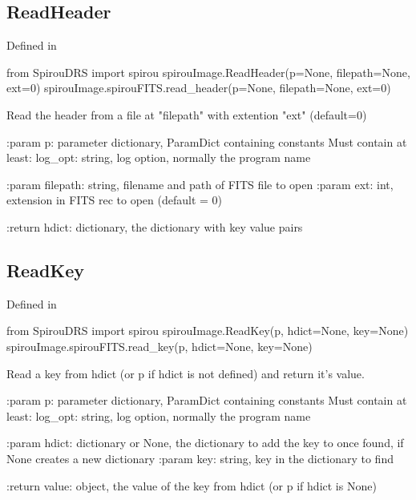 \begin{minipage}{\textwidth}
\subsection{ReadHeader}

Defined in \spirouImage{}

\begin{pythonbox}
from SpirouDRS import spirou
spirouImage.ReadHeader(p=None, filepath=None, ext=0)
spirouImage.spirouFITS.read_header(p=None, filepath=None, ext=0)
\end{pythonbox}

\begin{pythondocstring}
Read the header from a file at "filepath" with extention "ext" (default=0)

:param p: parameter dictionary, ParamDict containing constants
    Must contain at least:
            log_opt: string, log option, normally the program name

:param filepath: string, filename and path of FITS file to open
:param ext: int, extension in FITS rec to open (default = 0)

:return hdict: dictionary, the dictionary with key value pairs
\end{pythondocstring}
\end{minipage}


\begin{minipage}{\textwidth}
\subsection{ReadKey}

Defined in \spirouImage{}

\begin{pythonbox}
from SpirouDRS import spirou
spirouImage.ReadKey(p, hdict=None, key=None)
spirouImage.spirouFITS.read_key(p, hdict=None, key=None)
\end{pythonbox}

\begin{pythondocstring}
Read a key from hdict (or p if hdict is not defined) and return it's
value.

:param p: parameter dictionary, ParamDict containing constants
    Must contain at least:
            log_opt: string, log option, normally the program name

:param hdict: dictionary or None, the dictionary to add the key to once
              found, if None creates a new dictionary
:param key: string, key in the dictionary to find

:return value: object, the value of the key from hdict
               (or p if hdict is None)
\end{pythondocstring}
\end{minipage}

